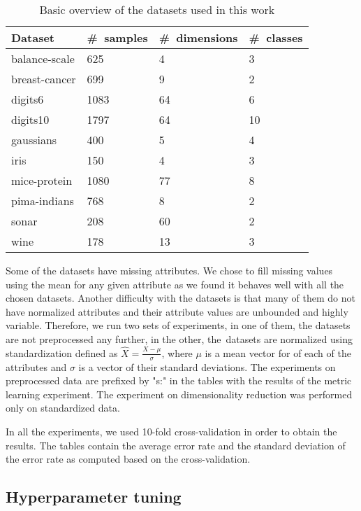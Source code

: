 \begin{table}[t] \centering
\caption{Basic overview of the datasets used in this work} \label{tab:datasets}
\begin{tabular}{llll}
\toprule
Dataset & \#~samples & \#~dimensions & \#~classes \\
\midrule
balance-scale           & 625   & 4    & 3  \\
breast-cancer           & 699   & 9    & 2  \\
digits6                 & 1083  & 64   & 6  \\
digits10                & 1797  & 64  & 10 \\
gaussians               & 400   & 5   & 4  \\
iris                    & 150   & 4    & 3  \\
mice-protein            & 1080  & 77   & 8  \\
pima-indians            & 768   & 8    & 2  \\
sonar                   & 208   & 60   & 2  \\
wine                    & 178   & 13   & 3  \\
\bottomrule
\end{tabular}
\end{table}

Some of the datasets have missing attributes. We chose to fill missing values using the mean for any given attribute as we found it behaves well with all the chosen datasets. Another difficulty with the datasets is that many of them do not have normalized attributes and their attribute values are unbounded and highly variable. Therefore, we run two sets of experiments, in one of them, the datasets are not preprocessed any further, in the other, the~datasets are normalized using standardization defined as $\hat{X} = \frac{X-\mu}{\sigma}$, where $\mu$ is a mean vector for of each of the attributes and $\sigma$ is a vector of their standard deviations. The experiments on preprocessed data are prefixed by "s:" in the tables with the results of the metric learning experiment. The experiment on dimensionality reduction was performed only on standardized data.

In all the experiments, we used 10-fold cross-validation in order to obtain the results. The tables contain the average error rate and the standard deviation of the error rate as computed based on the cross-validation.

\subsection{Hyperparameter tuning}

